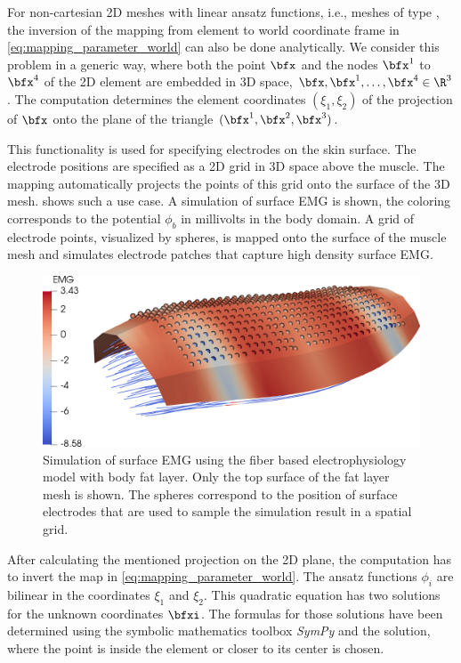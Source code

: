 For non-cartesian 2D meshes with linear ansatz functions, i.e., meshes of type , the inversion of the mapping from element to world coordinate frame in \cref{eq:mapping_parameter_world} can also be done analytically. We consider this problem in a generic way, where both the point $\bfx$ and the nodes $\bfx^1$ to $\bfx^4$ of the 2D element are embedded in 3D space, $\bfx,\bfx^1,\dots,\bfx^4 \in \R^3$. The computation determines the element coordinates $(\xi_1,\xi_2)$ of the projection of $\bfx$ onto the plane of the triangle $(\bfx^1,\bfx^2,\bfx^3)$. 

This functionality is used for specifying electrodes on the skin surface. The electrode positions are specified as a 2D grid in 3D space above the muscle. The mapping automatically projects the points of this grid onto the surface of the 3D mesh.  shows such a use case. A simulation of surface EMG is shown, the coloring corresponds to the potential $\phi_b$ in millivolts in the body domain. A grid of electrode points, visualized by spheres, is mapped onto the surface of the muscle mesh and simulates electrode patches that capture high density surface EMG.

\begin{figure}%
  \centering%
  \includegraphics[width=\textwidth]{images/implementation/electrodes.png}%
  \caption{Simulation of surface EMG using the fiber based electrophysiology model with body fat layer. Only the top surface of the fat layer mesh is shown. The spheres correspond to the position of surface electrodes that are used to sample the simulation result in a spatial grid.}%
  \label{fig:electrodes}%
\end{figure}%

After calculating the mentioned projection on the 2D plane, the computation has to invert the map in \cref{eq:mapping_parameter_world}. The ansatz functions $\phi_i$ are bilinear in the coordinates $\xi_1$ and $\xi_2$. This quadratic equation has two solutions for the unknown coordinates $\bfxi$. The formulas for those solutions have been determined using the symbolic mathematics toolbox \emph{SymPy} \cite{meurer2017sympy} and the solution, where the point is inside the element or closer to its center is chosen.

